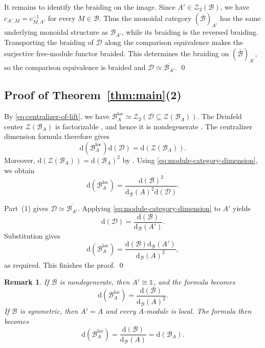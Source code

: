 \documentclass[10pt,a4paper]{amsart}
\numberwithin{equation}{section}
\newtheorem{remark}[thmctr]{Remark}
\newcommand{\unit}{\mathds{1}}
\newcommand{\B}{\mathcal{B}}
\newcommand{\D}{\mathcal{D}}
\newcommand{\Z}{\mathcal{Z}}
\newcommand{\loc}{\mathrm{loc}}
\newcommand{\FP}{\mathrm{d}}
\newcommand{\oB}{\overline{\B}}
\begin{document}
It remains to identify the braiding on the image. Since
$A'\in\Z_2(\B)$, we have $c_{A',M}=c_{M,A'}^{-1}$ for every $M\in\B$.
Thus the monoidal category $(\oB)_{A'}$ has the same
underlying monoidal structure as $\B_{A'}$, while its braiding is the
reversed braiding. Transporting the braiding of $\D$ along the comparison
equivalence makes the surjective free-module functor braided. This determines
the braiding on $(\oB)_{A'}$, so the comparison equivalence is braided and 
$\D\simeq\overline{\B_{A'}}$. \qed



\subsection{Proof of Theorem~\ref{thm:main}(2)}
By \eqref{eq:centralizer-of-lift}, we have
$\B_A^{\loc}\simeq\Z_2(\D\subseteq\Z(\B_A))$. The Drinfeld center
$\Z(\B_A)$ is factorizable
\cite[Proposition~8.6.3]{etingof2016tensor}, and hence it is nondegenerate
\cite[Theorem~4.2]{shimizu2019non}.
The centralizer dimension formula
\cite[Theorem~4.9]{shimizu2019non} therefore gives
\[
  \FP(\B_A^{\loc})\FP(\D)
  =
  \FP(\Z(\B_A)).
\]
Moreover, $\FP(\Z(\B_A))=\FP(\B_A)^2$ 
by \cite[Theorem~7.16.6]{etingof2016tensor}. Using
\eqref{eq:module-category-dimension}, we obtain
\[
  \FP(\B_A^{\loc})
  =
  \frac{\FP(\B)^2}{\FP_{\B}(A)^2\FP(\D)}.
\]

Part~(1) gives $\D\simeq\overline{\B_{A'}}$. Applying
\eqref{eq:module-category-dimension} to $A'$ yields
\[
  \FP(\D)
  =
  \frac{\FP(\B)}{\FP_{\B}(A')}.
\]
Substitution gives
\[
  \FP(\B_A^{\loc})
  =
  \frac{\FP(\B)\FP_{\B}(A')}{\FP_{\B}(A)^2},
\]
as required. This finishes the proof. \qed


\begin{remark}
If $\B$ is nondegenerate, then $A'\cong\unit$, and the formula becomes
\[
  \FP(\B_A^{\loc})
  =
  \frac{\FP(\B)}{\FP_{\B}(A)^2}.
\]
If $\B$ is symmetric, then $A'=A$ and every $A$-module is local. The formula
then becomes
\[
  \FP(\B_A^{\loc})
  =
  \frac{\FP(\B)}{\FP_{\B}(A)}
  =
  \FP(\B_A).
\]
\end{remark}

\end{document}
